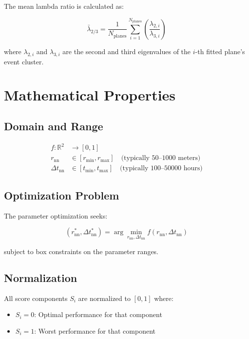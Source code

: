 \documentclass[11pt,a4paper]{article}
\begin{document}
The mean lambda ratio is calculated as:

\begin{equation}
\label{eq:mean_lambda}
\bar{\lambda}_{2/3} = \frac{1}{N_{\text{planes}}} \sum_{i=1}^{N_{\text{planes}}} \left(\frac{\lambda_{2,i}}{\lambda_{3,i}}\right)
\end{equation}

where $\lambda_{2,i}$ and $\lambda_{3,i}$ are the second and third eigenvalues of the $i$-th fitted plane's event cluster.

\section{Mathematical Properties}

\subsection{Domain and Range}

\begin{align}
f: \mathbb{R}^2 &\to [0, 1] \\
r_{\text{nn}} &\in [r_{\min}, r_{\max}] \quad \text{(typically 50--1000 meters)} \\
\Delta t_{\text{nn}} &\in [t_{\min}, t_{\max}] \quad \text{(typically 100--50000 hours)}
\end{align}

\subsection{Optimization Problem}

The parameter optimization seeks:

\begin{equation}
\label{eq:optimization}
(r_{\text{nn}}^*, \Delta t_{\text{nn}}^*) = \arg\min_{r_{\text{nn}}, \Delta t_{\text{nn}}} f(r_{\text{nn}}, \Delta t_{\text{nn}})
\end{equation}

subject to box constraints on the parameter ranges.

\subsection{Normalization}

All score components $S_i$ are normalized to $[0, 1]$ where:
\begin{itemize}
    \item $S_i = 0$: Optimal performance for that component
    \item $S_i = 1$: Worst performance for that component
\end{itemize}
\end{document}
